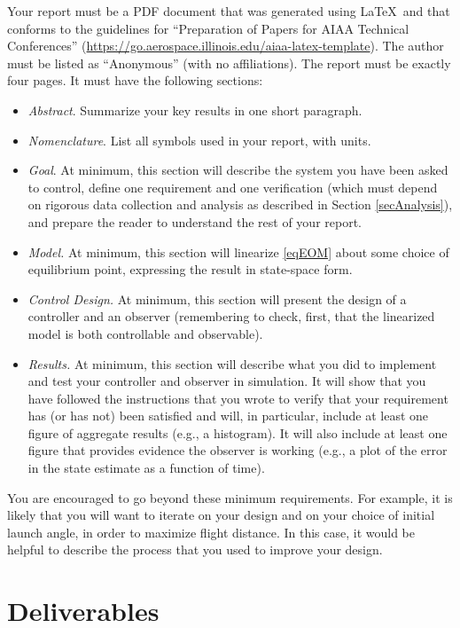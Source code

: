 \documentclass[conf]{new-aiaa}
\begin{document}
Your report must be a PDF document that was generated using \LaTeX\ and that conforms to the guidelines for ``Preparation of Papers for AIAA Technical Conferences'' (\url{https://go.aerospace.illinois.edu/aiaa-latex-template}). The author must be listed as ``Anonymous'' (with no affiliations). The report must be exactly four pages. It must have the following sections:
\begin{itemize}
\item {\em Abstract}. Summarize your key results in one short paragraph.
\item {\em Nomenclature}. List all symbols used in your report, with units.
\item {\em Goal}. At minimum, this section will describe the system you have been asked to control, define one requirement and one verification (which must depend on rigorous data collection and analysis as described in Section \ref{secAnalysis}), and prepare the reader to understand the rest of your report.
\item {\em Model.} At minimum, this section will linearize \eqref{eqEOM} about some choice of equilibrium point, expressing the result in state-space form.
\item {\em Control Design.} At minimum, this section will present the design of a controller and an observer (remembering to check, first, that the linearized model is both controllable and observable).
\item {\em Results.} At minimum, this section will describe what you did to implement and test your controller and observer in simulation. It will show that you have followed the instructions that you wrote to verify that your requirement has (or has not) been satisfied and will, in particular, include at least one figure of aggregate results (e.g., a histogram). It will also include at least one figure that provides evidence the observer is working (e.g., a plot of the error in the state estimate as a function of time).
\end{itemize}
You are encouraged to go beyond these minimum requirements. For example, it is likely that you will want to iterate on your design and on your choice of initial launch angle, in order to maximize flight distance. In this case, it would be helpful to describe the process that you used to improve your design.


\section{Deliverables}
\end{document}
